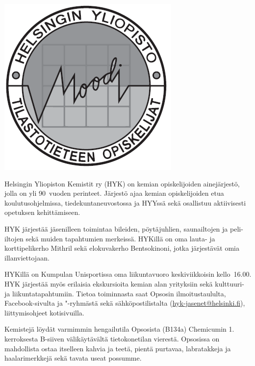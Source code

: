 \documentclass[a5paper, 8pt, twocolumn]{book} %
\numberwithin{equation}{section}
\begin{document}
\includegraphics[width=\columnwidth]{moodi.png}	

Helsingin Yliopiston Kemistit ry (HYK)
on kemian opiskelijoiden ainejärjestö, jolla
on yli 90~vuoden perinteet. Järjestö ajaa
kemian opiskelijoiden etua koulutusohjelmissa, tiedekuntaneuvostossa
ja HYYssä sekä osallistuu aktiivisesti opetuksen kehittämiseen.

HYK järjestää jäsenilleen toimintaa bileiden,
pöytäjuhlien, saunailtojen ja peli-iltojen
sekä muiden tapahtumien merkeissä.
HYKillä on oma lauta- ja korttipelikerho
Mithril sekä elokuvakerho Bentsokinoni,
jotka järjestävät omia illanviettojaan.

HYKillä on Kumpulan Unisportissa oma liikuntavuoro
keskiviikkoisin kello~16.00. HYK järjestää myös
erilaisia ekskursioita kemian alan yrityksiin
sekä kulttuuri- ja liikuntatapahtumiin.
Tietoa toiminnasta saat Opsosin ilmoitustaululta,
Facebook-sivulta ja "-ryhmästä sekä sähköpostilistalta (\url{hyk-jasenet@helsinki.fi}),
liittymisohjeet kotisivuilla.

Kemistejä löydät varmimmin hengailutila
Opsosista (B134a) Chemicumin 1.\,kerroksesta
B-siiven välikäytävältä tietokonetilan vierestä. 
Opsosissa on mahdollista ostaa itselleen kahvia ja teetä,
pientä purtavaa, labratakkeja ja haalarimerkkejä sekä tavata useat possumme.
\end{document}
